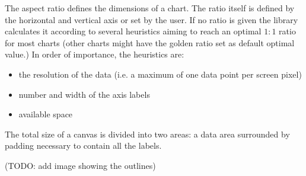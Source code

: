 The aspect ratio defines the dimensions of a chart. The ratio itself is defined by the horizontal and vertical axis or set by the user. If no ratio is given the library calculates it according to several heuristics aiming to reach an optimal $1:1$ ratio for most charts (other charts might have the golden ratio \cite{weisstein09, few04} set as default optimal value.) In order of importance, the heuristics are: 
\begin{itemize}
\item the resolution of the data (i.e. a maximum of one data point per screen pixel)
\item number and width of the axis labels
\item available space
\end{itemize}
The total size of a canvas is divided into two areas: a data area surrounded by padding necessary to contain all the labels.

(TODO: add image showing the outlines)

